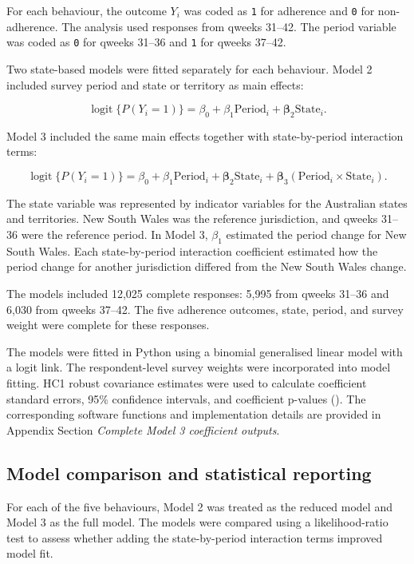 \documentclass[
  12pt,
  a4paper,
]{article}
\begin{document}
For each behaviour, the outcome \(Y_i\) was coded as \texttt{1} for adherence and
\texttt{0} for non-adherence. The analysis used responses from qweeks 31--42.
The period variable was coded as \texttt{0} for qweeks 31--36 and \texttt{1} for
qweeks 37--42.

Two state-based models were fitted separately for each behaviour. Model
2 included survey period and state or territory as main effects:

\[
\operatorname{logit}\{P(Y_i = 1)\}
=
\beta_0
+
\beta_1\text{Period}_i
+
\boldsymbol{\beta}_2\text{State}_i.
\]

Model 3 included the same main effects together with state-by-period
interaction terms:

\[
\operatorname{logit}\{P(Y_i = 1)\}
=
\beta_0
+
\beta_1\text{Period}_i
+
\boldsymbol{\beta}_2\text{State}_i
+
\boldsymbol{\beta}_3
(\text{Period}_i \times \text{State}_i).
\]

The state variable was represented by indicator variables for the
Australian states and territories. New South Wales was the reference
jurisdiction, and qweeks 31--36 were the reference period. In Model 3,
\(\beta_1\) estimated the period change for New South Wales. Each
state-by-period interaction coefficient estimated how the period change
for another jurisdiction differed from the New South Wales change.

The models included 12,025 complete responses: 5,995 from qweeks 31--36
and 6,030 from qweeks 37--42. The five adherence outcomes, state,
period, and survey weight were complete for these responses.

The models were fitted in Python using a binomial generalised linear
model with a logit link. The respondent-level survey weights were
incorporated into model fitting. HC1 robust covariance estimates were
used to calculate coefficient standard errors, 95\% confidence intervals,
and coefficient p-values (). The corresponding software
functions and implementation details are provided in Appendix Section
\emph{Complete Model 3 coefficient outputs}.

\subsection{Model comparison and statistical reporting}\label{model-comparison-and-statistical-reporting}

For each of the five behaviours, Model 2 was treated as the reduced
model and Model 3 as the full model. The models were compared using a
likelihood-ratio test to assess whether adding the state-by-period
interaction terms improved model fit.
\end{document}
